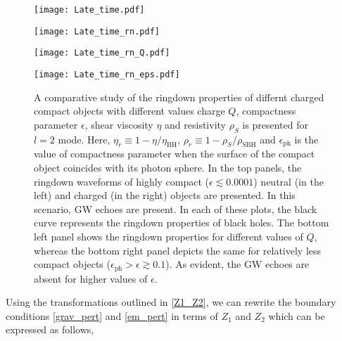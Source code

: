 \documentclass[aps,prd,twocolumn,floatfix,noshowpacs,tightenlines,noshowkeys,superscriptaddress,amsmath,amssymb,
nofootinbib]{revtex4-1}
\renewcommand\[{\begin{equation}}
\renewcommand\]{\end{equation}}
\begin{document}
\begin{figure*}[th]
	\centering
		\begin{minipage}[b]{0.48\textwidth}
			\texttt{[image: Late\_time.pdf]}
		\end{minipage}
		\hfill
		\begin{minipage}[b]{0.48\textwidth}
			\texttt{[image: Late\_time\_rn.pdf]}
		\end{minipage}\par
			\hfill
			\begin{minipage}[b]{0.48\textwidth}
				\texttt{[image: Late\_time\_rn\_Q.pdf]}
			\end{minipage}
				\hfill
				\begin{minipage}[b]{0.48\textwidth}
					\texttt{[image: Late\_time\_rn\_eps.pdf]}
				\end{minipage}
	\caption{A comparative study of the ringdown properties of differnt charged compact objects with different values charge $Q$, compactness parameter $\epsilon$, shear viscosity $\eta$ and resistivity $\rho_{S}$ is presented for $l=2$ mode.
		Here, $\eta_r\equiv1-\eta/\eta_{\textrm{BH}}$, $\rho_r\equiv1-\rho_{S}/\rho_{\textrm{SBH}}$ and $\epsilon_{\textrm{ph}}$ is the value of compactness parameter when the surface of the compact object coincides with its photon sphere. In the top panels, the ringdown waveforms of highly compact ($\epsilon\lesssim 0.0001$) neutral (in the left) and charged (in the right) objects are presented. In this scenario, GW echoes are present. In each of these plots, the black curve represents the ringdown properties of black holes.  The bottom left panel shows the ringdown properties for different values of $Q$, whereas the bottom right panel depicts the same for relatively less compact objects ($\epsilon_{\textrm{ph}}>\epsilon\gtrsim 0.1$). As evident, the GW echoes are absent for higher values of $\epsilon$. }\label{Ringdown}
\end{figure*}
 Using the transformations outlined in \autoref{Z1_Z2}, we can rewrite the boundary conditions \autoref{grav_pert} and \autoref{em_pert} in terms of $Z_1$ and $Z_2$ which can be expressed as follows,
\end{document}
